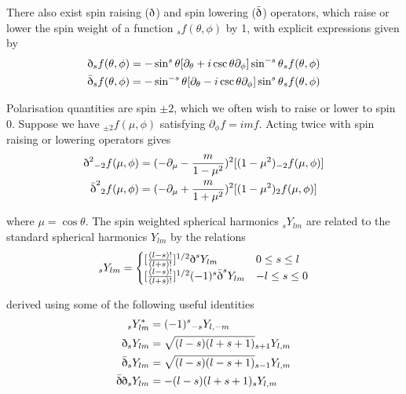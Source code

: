 \documentclass[a4paper,10pt]{article}
\newcommand{\sr}{\text{\normalfont\dh}}
\renewcommand{\sl}{\bar{\text{\normalfont\dh}}}
\begin{document}
There also exist spin raising ($\sr$) and spin lowering ($\sl$) operators, which raise or lower the spin weight of a function $_sf(\theta,\phi)$ by 1, with explicit expressions given by
\begin{equation}\begin{split}
\sr {}_sf(\theta, \phi) &= -\sin^s{\theta}[\partial_\theta+i\csc{\theta}\partial_\phi]\sin^{-s}{\theta}{}_sf(\theta, \phi)\\
\sl {}_sf(\theta, \phi) &= -\sin^{-s}{\theta}[\partial_\theta-i\csc{\theta}\partial_\phi]\sin^{s}{\theta}{}_sf(\theta, \phi)
\label{explicitspinraiselower}
\end{split}\end{equation}

Polarisation quantities are spin $\pm 2$, which we often wish to raise or lower to spin 0. Suppose we have ${}_{\pm2}f(\mu,\phi)$ satisfying $\partial_\phi{}f=imf$. Acting twice with spin raising or lowering operators gives
\begin{equation}\begin{split}
\sr^2{}_{-2}f(\mu, \phi) &= (-\partial_\mu-\frac{m}{1-\mu^2})^2[(1-\mu^2)_{-2}f(\mu,\phi)]\\
\sl^2{}_2f(\mu, \phi) &= (-\partial_\mu+\frac{m}{1+\mu^2})^2[(1-\mu^2)_2f(\mu,\phi)]
\label{+-2}
\end{split}\end{equation}

where $\mu=\cos\theta$. The spin weighted spherical harmonics $_sY_{lm}$ are related to the standard spherical harmonics $Y_{lm}$ by the relations
\begin{equation}
_sY_{lm} = 
\begin{cases}
[\frac{(l-s)!}{(l+s)!}]^{1/2}\sr^s Y_{lm} & 0\leq s\leq l\\
[\frac{(l-s)!}{(l+s)!}]^{1/2}(-1)^s\sl^s Y_{lm} & -l\leq s\leq 0
\end{cases}
\end{equation}

derived using some of the following useful identities
\begin{equation}\begin{split}
{}_sY_{lm}^* &= (-1)^s {}_{-s}Y_{l,-m}\\
\sr {}_sY_{lm} &= \sqrt{(l-s)(l+s+1)}{}_{s+1}Y_{l,m}\\
\sl {}_sY_{lm} &= \sqrt{(l-s)(l-s+1)}{}_{s-1}Y_{l,m}\\
\sl\sr {}_sY_{lm} &= -(l-s)(l+s+1){}_{s}Y_{l,m}
\label{propertiesofspin}
\end{split}\end{equation}
\end{document}

